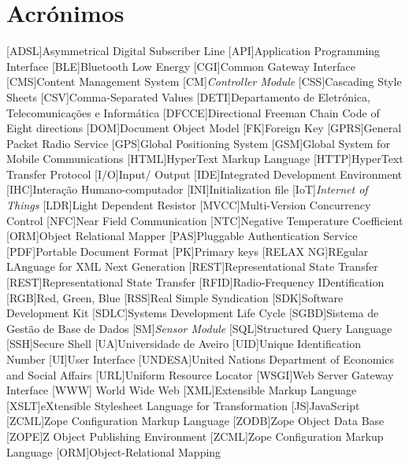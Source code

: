 
\chapter*{Acrónimos}

\begin{multicols}{2}
	
\begin{acronym}[RELAX NG]
	
	[ADSL]{Asymmetrical Digital Subscriber Line}
	[API]{Application Programming Interface}
	[BLE]{Bluetooth Low Energy}
	[CGI]{Common Gateway Interface}
	[CMS]{Content Management System}
	[CM]{\textit{Controller Module}}
	[CSS]{Cascading Style Sheets}
	[CSV]{Comma-Separated Values}
	[DETI]{Departamento de Eletrónica, Telecomunicações e Informática}
	[DFCCE]{Directional Freeman Chain Code of Eight directions}
	[DOM]{Document Object Model}
	[FK]{Foreign Key}
	[GPRS]{General Packet Radio Service}
	[GPS]{Global Positioning System}
	[GSM]{Global System for Mobile Communications}
	[HTML]{HyperText Markup Language}
	[HTTP]{HyperText Transfer Protocol}		
	[I/O]{Input/ Output}
	[IDE]{Integrated Development Environment}
	[IHC]{Interação Humano-computador}	
	[INI]{Initialization file}	
	[IoT]{\textit{Internet of Things}}			
	[LDR]{Light Dependent Resistor}
	[MVCC]{Multi-Version Concurrency Control}		
	[NFC]{Near Field Communication}
	[NTC]{Negative Temperature Coefficient}
	[ORM]{Object Relational Mapper}
	[PAS]{Pluggable Authentication Service}
	[PDF]{Portable Document Format}
	[PK]{Primary keys}
	[RELAX NG]{REgular LAnguage for XML Next Generation}
	[REST]{Representational State Transfer}
	[REST]{Representational State Transfer}
	[RFID]{Radio-Frequency IDentification}
	[RGB]{Red, Green, Blue}
	[RSS]{Real Simple Syndication}
	[SDK]{Software Development Kit}
	[SDLC]{Systems Development Life Cycle}
	[SGBD]{Sistema de Gestão de Base de Dados}
	[SM]{\textit{Sensor Module}}
	[SQL]{Structured Query Language}		
	[SSH]{Secure Shell}
	[UA]{Universidade de Aveiro}
	[UID]{Unique Identification Number}
	[UI]{User Interface}
	[UNDESA]{United Nations Department of Economics and Social Affairs}
	[URL]{Uniform Resource Locator}
	[WSGI]{Web Server Gateway Interface}
	[WWW]{ World Wide Web}
	[XML]{Extensible Markup Language}
	[XSLT]{eXtensible Stylesheet Language for Transformation}
	[JS]{JavaScript}	
	[ZCML]{Zope Configuration Markup Language}
	[ZODB]{Zope Object Data Base}
	[ZOPE]{Z Object Publishing Environment}
	[ZCML]{Zope Configuration Markup Language}
	[ORM]{Object-Relational Mapping}
	

\end{acronym}
\end{multicols}
